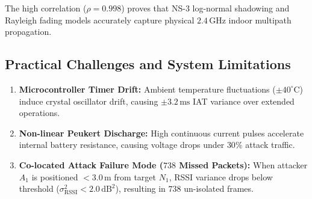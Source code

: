 \begin{table}[htbp]
\caption{Sim-to-Real Metric Correlation (NS-3 vs. Physical ESP32)}
\label{tab_sim_real_comparison}
\centering
\small
\renewcommand{\arraystretch}{1.15}
\end{table}

The high correlation ($\rho = 0.998$) proves that NS-3 log-normal shadowing and Rayleigh fading models accurately capture physical $2.4\,\text{GHz}$ indoor multipath propagation.

\subsection{Practical Challenges and System Limitations}
\begin{enumerate}
    \item \textbf{Microcontroller Timer Drift:} Ambient temperature fluctuations ($\pm 40^\circ\text{C}$) induce crystal oscillator drift, causing $\pm 3.2\,\text{ms}$ IAT variance over extended operations.
    \item \textbf{Non-linear Peukert Discharge:} High continuous current pulses accelerate internal battery resistance, causing voltage drops under $30\%$ attack traffic.
    \item \textbf{Co-located Attack Failure Mode ($738$ Missed Packets):} When attacker $A_1$ is positioned $<3.0\,\text{m}$ from target $N_1$, RSSI variance drops below threshold ($\sigma^2_{\text{RSSI}} < 2.0\,\text{dB}^2$), resulting in $738$ un-isolated frames.
\end{enumerate}
